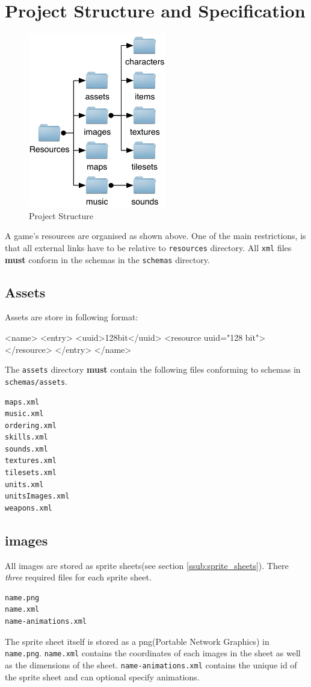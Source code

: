 \section{Project Structure and Specification}

\begin{figure}[htbp]
	\centering
		\includegraphics[height=3in]{figures/Files.pdf}
	\caption{Project Structure}
	\label{fig:figures_Files}
\end{figure}

A game's resources  are organised as shown above. One of the main restrictions, is that all external links have to be relative to \texttt{resources} directory. All \texttt{xml} files \textbf{must} conform in the schemas in the \texttt{schemas} directory. 


\subsection{Assets}
Assets are store in following format:
\begin{lst:resource}[caption=Assets format]
<name>
  <entry>
    <uuid>128bit</uuid> 
    <resource uuid="128 bit">
    </resource>
  </entry>
</name>
\end{lst:resource}

The \texttt{assets} directory \textbf{must} contain the following files conforming to schemas in \texttt{schemas/assets}.
\begin{lstlisting}[caption=Required Assets]
maps.xml
music.xml
ordering.xml
skills.xml
sounds.xml
textures.xml
tilesets.xml
units.xml
unitsImages.xml
weapons.xml
\end{lstlisting}

\subsection{images}
All images are stored as sprite sheets(see section \ref{ssub:sprite_sheets}).  There \emph{three} required files for each sprite sheet. 
\begin{lstlisting}
name.png
name.xml
name-animations.xml
\end{lstlisting}
The sprite sheet itself is stored as  a png(Portable Network Graphics) in \texttt{name.png}. \texttt{name.xml} contains the coordinates of each images in the sheet as well as the dimensions of the sheet. \texttt{name-animations.xml} contains the unique id of the sprite sheet and can optional specify animations. 


